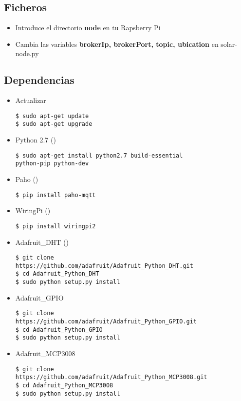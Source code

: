 \subsection{Ficheros}
\label{makereference5.1.3}
	\begin{itemize}
		\item Introduce el directorio \textbf{node} en tu Rapsberry Pi
		\item Cambia las variables \textbf{brokerIp, brokerPort, topic, ubication} en solar-node.py
	\end{itemize}

\subsection{Dependencias}
\label{makereference5.1.4}
	\begin{itemize}
		\item Actualizar
\lstset{language=bash}
\begin{lstlisting}[frame=single]
$ sudo apt-get update
$ sudo apt-get upgrade
\end{lstlisting}
		\item Python 2.7 (\cite{ARP:Python:2017})
\begin{lstlisting}[frame=single]
$ sudo apt-get install python2.7 build-essential 
python-pip python-dev
\end{lstlisting}
		\item Paho (\cite{ARP:Paho:2017})
\begin{lstlisting}[frame=single]
$ pip install paho-mqtt
\end{lstlisting}
		\item WiringPi (\cite{ARP:Wiring:2017})
\begin{lstlisting}[frame=single]
$ pip install wiringpi2
\end{lstlisting}
		\item Adafruit\_DHT (\cite{ARP:Adafruit:2017})
\begin{lstlisting}[frame=single]
$ git clone 
https://github.com/adafruit/Adafruit_Python_DHT.git
$ cd Adafruit_Python_DHT
$ sudo python setup.py install
\end{lstlisting}
		\item Adafruit\_GPIO
\begin{lstlisting}[frame=single]
$ git clone 
https://github.com/adafruit/Adafruit_Python_GPIO.git
$ cd Adafruit_Python_GPIO
$ sudo python setup.py install
\end{lstlisting}
		\item Adafruit\_MCP3008
\begin{lstlisting}[frame=single]
$ git clone 
https://github.com/adafruit/Adafruit_Python_MCP3008.git
$ cd Adafruit_Python_MCP3008
$ sudo python setup.py install
\end{lstlisting}
	\end{itemize}

